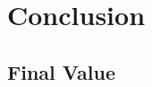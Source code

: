 \chapter{Conclusion}
\label{chapter:Conclusion}
\thispagestyle{myheadings} %

\section{Final Value}
\label{sec:FinalValue}
